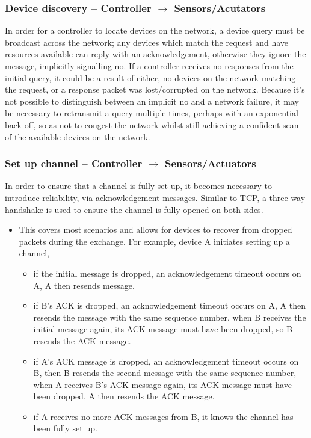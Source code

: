 \subsubsection{Device discovery -- Controller $\rightarrow$ Sensors/Acutators} %
\label{ssub:subsubsection_name}
In order for a controller to locate devices on the network, a device query must be broadcast across the network; any devices which match the request and have resources available can reply with an acknowledgement, otherwise they ignore the message, implicitly signalling no.
If a controller receives no responses from the initial query, it could be a result of either, no devices on the network matching the request, or a response packet was lost/corrupted on the network. Because it's not possible to distinguish between an implicit no and a network failure, it may be necessary to retransmit a query multiple times, perhaps with an exponential back-off, so as not to congest the network whilst still achieving a confident scan of the available devices on the network.


\subsubsection{Set up channel -- Controller $\rightarrow$ Sensors/Actuators} %
\label{ssub:set_up_channel}
In order to ensure that a channel is fully set up, it becomes necessary to introduce reliability, via acknowledgement messages. Similar to TCP, a three-way handshake is used to ensure the channel is fully opened on both sides.

\begin{itemize}
 	\item This covers most scenarios and allows for devices to recover from dropped packets during the exchange. For example, device A initiates setting up a channel,
 	\begin{itemize}
 		\item if the initial message is dropped, an acknowledgement timeout occurs on A, A then resends message.
 		\item if B's ACK is dropped, an acknowledgement timeout occurs on A, A then resends the message with the same sequence number, when B receives the initial message again, its ACK message must have been dropped, so B resends the ACK message.
 		\item if A's ACK message is dropped, an acknowledgement timeout occurs on B, then B resends the second message with the same sequence number, when A receives B's ACK message again, its ACK message must have been dropped, A then resends the ACK message.
 		\item if A receives no more ACK messages from B, it knows the channel has been fully set up.
 	\end{itemize}
 \end{itemize} 

